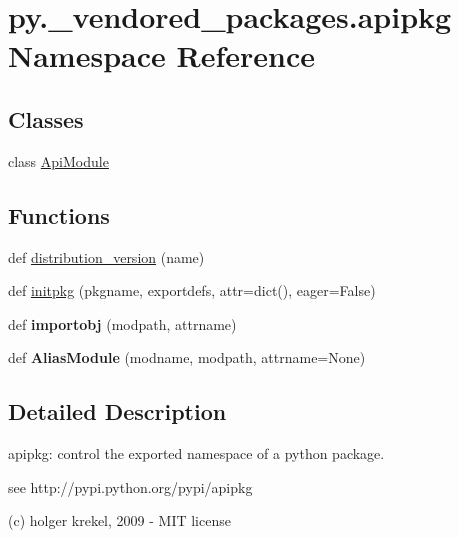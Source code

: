 \hypertarget{namespacepy_1_1__vendored__packages_1_1apipkg}{}\section{py.\+\_\+vendored\+\_\+packages.\+apipkg Namespace Reference}
\label{namespacepy_1_1__vendored__packages_1_1apipkg}
\subsection*{Classes}
\begin{DoxyCompactItemize}
\item 
class \hyperlink{classpy_1_1__vendored__packages_1_1apipkg_1_1_api_module}{Api\+Module}
\end{DoxyCompactItemize}
\subsection*{Functions}
\begin{DoxyCompactItemize}
\item 
def \hyperlink{namespacepy_1_1__vendored__packages_1_1apipkg_a7a1ecd8854faed466c7412d6b83d57f6}{distribution\+\_\+version} (name)
\item 
def \hyperlink{namespacepy_1_1__vendored__packages_1_1apipkg_a59a3bd733b536fe5a9c339248f046b34}{initpkg} (pkgname, exportdefs, attr=dict(), eager=False)
\item 
\mbox{\label{namespacepy_1_1__vendored__packages_1_1apipkg_a67768bcd6dbc3a46957ce6dca8082156}} 
def {\bfseries importobj} (modpath, attrname)
\item 
\mbox{\label{namespacepy_1_1__vendored__packages_1_1apipkg_a9d1dd25cae4b99b49ac91e6541acf815}} 
def {\bfseries Alias\+Module} (modname, modpath, attrname=None)
\end{DoxyCompactItemize}


\subsection{Detailed Description}
\begin{DoxyVerb}apipkg: control the exported namespace of a python package.

see http://pypi.python.org/pypi/apipkg

(c) holger krekel, 2009 - MIT license
\end{DoxyVerb}
 

